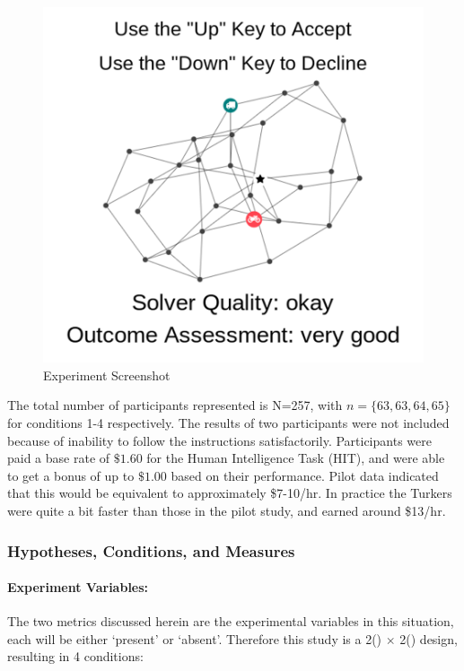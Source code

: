     \begin{figure}[tb]
        \centering
        \includegraphics[width=0.8\linewidth]{Figures/experiment_screenshot_Compressed.png}
        \caption{Experiment Screenshot}
        \label{fig:screenshot}
    \end{figure}

    The total number of participants represented is N=257, with $n=\{63,63,64,65\}$ for conditions 1-4 respectively. The results of two participants were not included because of inability to follow the instructions satisfactorily. Participants were paid a base rate of $\$1.60$ for the Human Intelligence Task (HIT), and were able to get a bonus of up to $\$1.00$ based on their performance. Pilot data indicated that this would be equivalent to approximately \$7-10/hr. In practice the Turkers were quite a bit faster than those in the pilot study, and earned around \$13/hr.

    \subsubsection{Hypotheses, Conditions, and Measures} \label{sec:hyp_cond_meas}
    \paragraph{Experiment Variables:}
    The two \famsec{} metrics discussed herein are the experimental variables in this situation, each will be either `present' or `absent'. Therefore this study is a 2(\xQ) $\times$ 2(\xO) design, resulting in 4 conditions:

